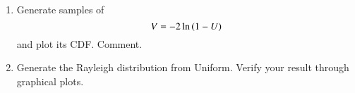 \begin{enumerate}[label=\thesection.\arabic*.,ref=\thesection.\theenumi]
%
%
\item
Generate samples of 
%
\begin{equation}
V = -2\ln\left(1-U\right)
\end{equation}
%
and plot its CDF.  Comment.

%
\item
Generate the Rayleigh distribution from Uniform. Verify your result through graphical plots.

\end{enumerate}
